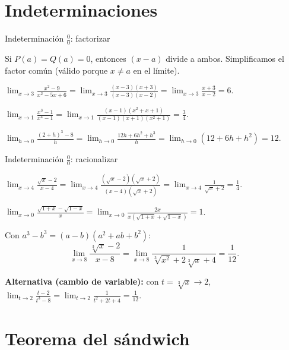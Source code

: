 \documentclass[10pt,aspectratio=169]{beamer}
\begin{document}
\section{Indeterminaciones}

\begin{frame}{Indeterminación $\frac00$: factorizar}
  \begin{idea}
    Si $P(a)=Q(a)=0$, entonces $(x-a)$ divide a ambos. Simplificamos el factor común (válido porque $x\neq a$ en el límite).
  \end{idea}
  \begin{ejemplo}[3]
    $\displaystyle\lim_{x\to3}\frac{x^2-9}{x^2-5x+6}=\lim_{x\to3}\frac{(x-3)(x+3)}{(x-3)(x-2)}=\lim_{x\to3}\frac{x+3}{x-2}=6$.
  \end{ejemplo}
  \begin{ejemplo}[4]
    $\displaystyle\lim_{x\to1}\frac{x^3-1}{x^4-1}=\lim_{x\to1}\frac{(x-1)(x^2+x+1)}{(x-1)(x+1)(x^2+1)}=\frac{3}{4}$.
  \end{ejemplo}
  \begin{ejemplo}
    $\displaystyle\lim_{h\to0}\frac{(2+h)^3-8}{h}=\lim_{h\to0}\frac{12h+6h^2+h^3}{h}=\lim_{h\to0}(12+6h+h^2)=12$.
  \end{ejemplo}
\end{frame}

\begin{frame}{Indeterminación $\frac00$: racionalizar}
  \begin{ejemplo}[6]
    $\displaystyle\lim_{x\to4}\frac{\sqrt x-2}{x-4}=\lim_{x\to4}\frac{(\sqrt x-2)(\sqrt x+2)}{(x-4)(\sqrt x+2)}=\lim_{x\to4}\frac{1}{\sqrt x+2}=\frac14$.
  \end{ejemplo}
  \begin{ejemplo}[7]
    $\displaystyle\lim_{x\to0}\frac{\sqrt{1+x}-\sqrt{1-x}}{x}=\lim_{x\to0}\frac{2x}{x\left(\sqrt{1+x}+\sqrt{1-x}\right)}=1$.
  \end{ejemplo}
  \begin{ejemplo}
    Con $a^3-b^3=(a-b)(a^2+ab+b^2)$:
    \[ \lim_{x\to8}\frac{\sqrt[3]x-2}{x-8}=\lim_{x\to8}\frac{1}{\sqrt[3]{x^2}+2\sqrt[3]x+4}=\frac1{12}. \]
  \end{ejemplo}
  \small \textbf{Alternativa (cambio de variable):} con $t=\sqrt[3]x\to2$, \
  $\lim_{t\to2}\frac{t-2}{t^3-8}=\lim_{t\to2}\frac{1}{t^2+2t+4}=\frac1{12}$.
\end{frame}

\section{Teorema del sándwich}
\end{document}
